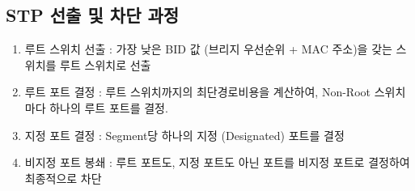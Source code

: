 \subsection{STP 선출 및 차단 과정}
    \begin{enumerate}
        \item 루트 스위치 선출 : 가장 낮은 BID 값 (브리지 우선순위 + MAC 주소)을 갖는 스위치를 루트 스위치로 선출
        \item 루트 포트 결정 : 루트 스위치까지의 최단경로비용을 계산하여, Non-Root 스위치 마다 하나의 루트 포트를 결정.
        \item 지정 포트 결정 : Segment당 하나의 지정 (Designated) 포트를 결정
        \item 비지정 포트 봉쇄 : 루트 포트도, 지정 포트도 아닌 포트를 비지정 포트로 결정하여 최종적으로 차단
    \end{enumerate}
\newpage